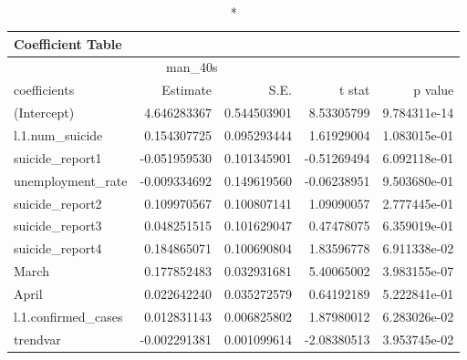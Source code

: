 \begin{longtable}{lrrrr}
\caption*{
{\large Coefficient Table}
} \\ 
\toprule
\multicolumn{4}{c}{man\_40s} &  \\ 
\cmidrule(lr){1-4}
coefficients & Estimate & S.E. & t stat & p value \\ 
\midrule\addlinespace[2.5pt]
(Intercept) & 4.646283367 & 0.544503901 & 8.53305799 & 9.784311e-14 \\ 
l.1.num\_suicide & 0.154307725 & 0.095293444 & 1.61929004 & 1.083015e-01 \\ 
suicide\_report1 & -0.051959530 & 0.101345901 & -0.51269494 & 6.092118e-01 \\ 
unemployment\_rate & -0.009334692 & 0.149619560 & -0.06238951 & 9.503680e-01 \\ 
suicide\_report2 & 0.109970567 & 0.100807141 & 1.09090057 & 2.777445e-01 \\ 
suicide\_report3 & 0.048251515 & 0.101629047 & 0.47478075 & 6.359019e-01 \\ 
suicide\_report4 & 0.184865071 & 0.100690804 & 1.83596778 & 6.911338e-02 \\ 
March & 0.177852483 & 0.032931681 & 5.40065002 & 3.983155e-07 \\ 
April & 0.022642240 & 0.035272579 & 0.64192189 & 5.222841e-01 \\ 
l.1.confirmed\_cases & 0.012831143 & 0.006825802 & 1.87980012 & 6.283026e-02 \\ 
trendvar & -0.002291381 & 0.001099614 & -2.08380513 & 3.953745e-02 \\ 
\bottomrule
\end{longtable}

